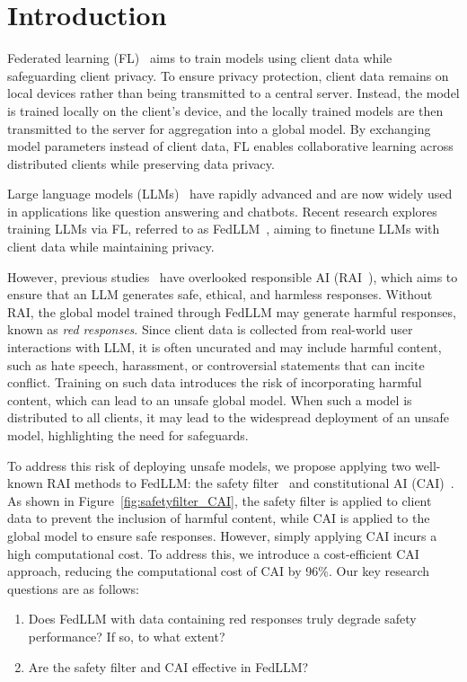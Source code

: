 
\section{Introduction}
Federated learning (FL)~\cite{fedavg,fedavgm,scaffold,fedprox,fedadam} aims to train models using client data while safeguarding client privacy.
To ensure privacy protection, client data remains on local devices rather than being transmitted to a central server.
Instead, the model is trained locally on the client’s device, and the locally trained models are then transmitted to the server for aggregation into a global model.
By exchanging model parameters instead of client data, FL enables collaborative learning across distributed clients while preserving data privacy.

Large language models (LLMs)~\cite{GPT3,openai2023gpt4,anil2023palm,team2023gemini,team2024gemma,touvron2023llama1,touvron2023llama2,vicuna2023,alpaca,llama3.1,abdin2024phi,yang2024qwen2} have rapidly advanced and are now widely used in applications like question answering and chatbots.
Recent research explores training LLMs via FL, referred to as FedLLM~\cite{FedPETuning,FedIT,sun2024improving,kuang2024federatedscope,OpenFedLLM}, aiming to finetune LLMs with client data while maintaining privacy.

However, previous studies~\cite{FedPETuning,FedIT,sun2024improving,kuang2024federatedscope,OpenFedLLM} have overlooked responsible AI (RAI~\cite{henderson2018ethical,bender2021dangers,weidinger2021ethical,hhh,bai2022training}), which aims to ensure that an LLM generates safe, ethical, and harmless responses. 
Without RAI, the global model trained through FedLLM may generate harmful responses, known as \textit{red responses}.
Since client data is collected from real-world user interactions with LLM, it is often uncurated and may include harmful content, such as hate speech, harassment, or controversial statements that can incite conflict.
Training on such data introduces the risk of incorporating harmful content, which can lead to an unsafe global model. 
When such a model is distributed to all clients, it may lead to the widespread deployment of an unsafe model, highlighting the need for safeguards.

To address this risk of deploying unsafe models, we propose applying two well-known RAI methods to FedLLM: the safety filter~\cite{llamaguard} and constitutional AI (CAI)~\cite{CAI}.
As shown in Figure~\ref{fig:safetyfilter_CAI}, the safety filter is applied to client data to prevent the inclusion of harmful content, while CAI is applied to the global model to ensure safe responses.
However, simply applying CAI incurs a high computational cost. To address this, we introduce a cost-efficient CAI approach, reducing the computational cost of CAI by 96\%.
Our key research questions are as follows:
\begin{enumerate}[label=\textbf{RQ\arabic*:}, leftmargin=*]
\item Does FedLLM with data containing red responses truly degrade safety performance? If so, to what extent?
\item Are the safety filter and CAI effective in FedLLM? 
\end{enumerate}

